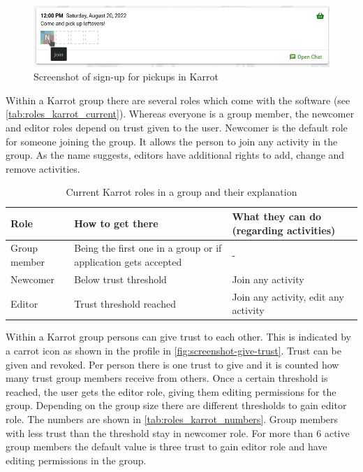 \documentclass[
	a4paper,%
	11pt,%
	]{article}
\begin{document}
\begin{figure}[ht]
	\includegraphics[width=\textwidth,
	]{images/screenshot_pick-ups.png}
	\caption{Screenshot of sign-up for pickups in Karrot}
	\label{fig:screenshot-pickup}
\end{figure}

Within a Karrot group there are several roles which come with the software (see \autoref{tab:roles_karrot_current}). Whereas everyone is a group member, the newcomer and editor roles depend on trust given to the user. Newcomer is the default role for someone joining the group. It allows the person to join any activity in the group. As the name suggests, editors have additional rights to add, change and remove activities. 


\begin{table}[ht]
	\centering
\caption{Current Karrot roles in a group and their explanation}
	\begin{tabular}{p{} p{} p{}}
		\toprule
		Role & How to get there & What they can do (regarding activities)\\
		\midrule
		Group member & Being the first one in a group or if application gets accepted & - \\
		Newcomer & Below trust threshold  & Join any activity \\
		Editor & Trust threshold reached & Join any activity, edit any activity\\
		\bottomrule
	\end{tabular}
\label{tab:roles_karrot_current}
\end{table}	

Within a Karrot group persons can give trust to each other. This is indicated by a carrot icon as shown in the profile in \autoref{fig:screenshot-give-trust}. Trust can be given and revoked. Per person there is one trust to give and it is counted how many trust group members receive from others. Once a certain threshold is reached, the user gets the editor role, giving them editing permissions for the group. Depending on the group size there are different thresholds to gain editor role. The numbers are shown in \autoref{tab:roles_karrot_numbers}. Group members with less trust than the threshold stay in newcomer role. For more than 6 active group members the default value is three trust to gain editor role and have editing permissions in the group.
\end{document}
